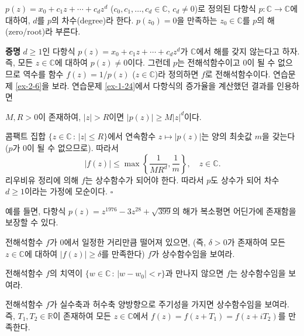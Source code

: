 $p(z) = x_0 + c_1z + \cdots + c_dz^d$ 
($c_0, c_1, \ldots, c_d\in \mathbb C$, $c_d\ne0$)로 정의된
다항식 $p:\mathbb C \to \mathbb C$에 대하여,
$d$를 $p$의 차수(degree)라 한다. 
$p(z_0)=0$을 만족하는 $z_0\in \mathbb C$를 $p$의 해(zero/root)라 부른다.

{\bf 증명}
$d\ge1$인 다항식 $p(z) = x_0 + c_1z + \cdots + c_dz^d$가
$\mathbb C$에서 해를 갖지 않는다고 하자.
즉, 모든 $z\in\mathbb C$에 대하여 $p(z)\ne0$이다.
그런데 $p$는 전해석함수이고 $0$이 될 수 없으므로 역수를 
함수 $f(z) = 1/p(z)$ ($z\in\mathbb C$)라 정의하면
$f$로 전해석함수이다. 연습문제 \ref{ex-2-6}을 보라.
연습문제 \ref{ex-1-24}에서 다항식의 증가율을 계산했던 결과를 인용하면
\begin{center}
$M,R>0$이 존재하여, $|z|>R$이면 $|p(z)|\ge M|z|^d$이다.
\end{center}
콤팩트 집합 $\{z\in\mathbb C\,:\, |z|\le R\}$에서
연속함수 $z\mapsto |p(z)|$는 양의 최솟값 $m$을 갖는다 ($p$가 $0$이 될 수 없으므로).
따라서
\[
|f(z)| \le \max\left\{ \dfrac1{MR^d}, \dfrac1m \right\}, \quad z\in\mathbb C.
\]
리우비유 정리에 의해 $f$는 상수함수가 되어야 한다.
따라서 $p$도 상수가 되어 차수 $d\ge1$이라는 가정에 모순이다.
\hfill $\square$

예를 들면, 다항식 $p(z) = z^{1976} -3z^{28} + \sqrt{399}$의 해가
복소평면 어딘가에 존재함을 보장할 수 있다.

\begin{salt_exercise} \label{ex-3-30}
전해석함수 $f$가 $0$에서 일정한 거리만큼 떨어져 있으면,
(즉, $\delta>0$가 존재하여 모든 $z\in\mathbb C$에 대하여 $|f(z)|\ge\delta$를 만족한다)
$f$가 상수함수임을 보여라.
\end{salt_exercise}

\begin{salt_exercise} \label{ex-3-31}
전해석함수 $f$의 치역이 $\{ w\in\mathbb C\,:\, |w-w_0| < r\}$과 만나지 않으면
$f$는 상수함수임을 보여라.
\end{salt_exercise}

\begin{salt_exercise} \label{ex-3-32}
전해석함수 $f$가 실수축과 허수축 양방향으로 주기성을 가지면 상수함수임을 보여라.
즉, $T_1, T_2\in \mathbb R$이 존재하여 
모든 $z\in \mathbb C$에서 $f(z) = f(z+T_1) =f(z+iT_2)$를 만족한다.
\end{salt_exercise}

